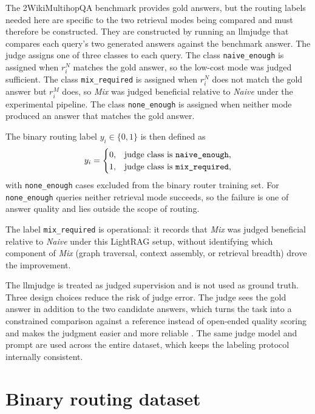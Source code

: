 \documentclass[english, bibtex]{kththesis}               %
\numberwithin{listing}{chapter}
\begin{document}
The 2WikiMultihopQA benchmark provides gold answers, but the routing labels needed here are specific to the two retrieval modes being compared and must therefore be constructed. They are constructed by running an \gls{llmjudge} \cite{zheng2023judge} that compares each query's two generated answers against the benchmark answer. The judge assigns one of three classes to each query. The class \texttt{naive\_enough} is assigned when \(r_i^N\) matches the gold answer, so the low-cost mode was judged sufficient. The class \texttt{mix\_required} is assigned when \(r_i^N\) does not match the gold answer but \(r_i^M\) does, so \emph{Mix} was judged beneficial relative to \emph{Naive} under the experimental pipeline. The class \texttt{none\_enough} is assigned when neither mode produced an answer that matches the gold answer.

The binary routing label \(y_i \in \{0, 1\}\) is then defined as
\begin{equation}
\label{eq:routingLabel}
y_i =
\begin{cases}
0, & \text{judge class is \texttt{naive\_enough},}\\
1, & \text{judge class is \texttt{mix\_required},}
\end{cases}
\end{equation}
with \texttt{none\_enough} cases excluded from the binary router training set. For \texttt{none\_enough} queries neither retrieval mode succeeds, so the failure is one of answer quality and lies outside the scope of routing.

The label \texttt{mix\_required} is operational: it records that \emph{Mix} was judged beneficial relative to \emph{Naive} under this LightRAG setup, without identifying which component of \emph{Mix} (graph traversal, context assembly, or retrieval breadth) drove the improvement.

The \gls{llmjudge} is treated as judged supervision and is not used as ground truth. Three design choices reduce the risk of judge error. The judge sees the gold answer in addition to the two candidate answers, which turns the task into a constrained comparison against a reference instead of open-ended quality scoring and makes the judgment easier and more reliable \cite{zheng2023judge}. The same judge model and prompt are used across the entire dataset, which keeps the labeling protocol internally consistent.

\section{Binary routing dataset}
\label{sec:methodDataset}
\end{document}
